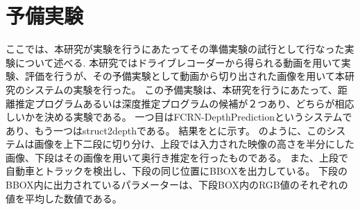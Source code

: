 \chapter{予備実験}
ここでは、本研究が実験を行うにあたってその準備実験の試行として行なった実験について述べる.
本研究ではドライブレコーダーから得られる動画を用いて実験、評価を行うが、その予備実験として動画から切り出された画像を用いて本研究のシステムの実験を行った。
この予備実験は、本研究を行うにあたって、距離推定プログラムあるいは深度推定プログラムの候補が２つあり、どちらが相応しいかを決める実験である。
一つ目はFCRN-DepthPrediction\cite{laina2016deeper}というシステムであり、もう一つはstruct2depthである。
結果をとに示す。
のように、このシステムは画像を上下二段に切り分け、上段では入力された映像の高さを半分にした画像、下段はその画像を用いて奥行き推定を行ったものである。
また、上段で自動車とトラックを検出し、下段の同じ位置にBBOXを出力している。
下段のBBOX内に出力されているパラメーターは、下段BOX内のRGB値のそれぞれの値を平均した数値である。


